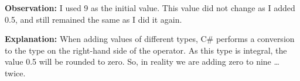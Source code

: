 \textbf{Observation:} I used 9 as the initial value. This value did not change as I added 0.5, and still remained the same as I did it again.

\textbf{Explanation:} When adding values of different types, C\# performs a conversion to the type on the right-hand side of the operator. As this type is integral, the value 0.5 will be rounded to zero. So, in reality we are adding zero to nine \ldots twice.


